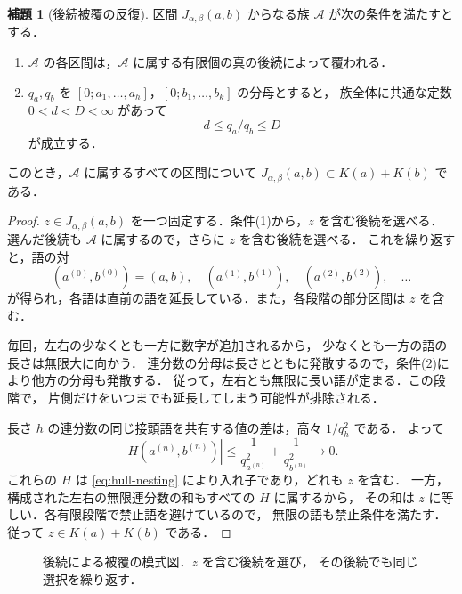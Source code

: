 \documentclass[11pt,a4paper]{article}
\theoremstyle{definition}
\newtheorem{lemma}{補題}
\newcommand{\A}{\mathcal A}
\begin{document}
\begin{lemma}[後続被覆の反復]\label{lem:filling}
区間 $J_{\alpha,\beta}(a,b)$ からなる族 $\A$ が次の条件を満たすとする．
\begin{enumerate}
\item $\A$ の各区間は，$\A$ に属する有限個の真の後続によって覆われる．
\item $q_a,q_b$ を $[0;a_1,\ldots,a_h]$，$[0;b_1,\ldots,b_k]$ の分母とすると，
族全体に共通な定数 $0<d<D<\infty$ があって
\[
 d\le q_a/q_b\le D
\]
が成立する．
\end{enumerate}
このとき，$\A$ に属するすべての区間について
$J_{\alpha,\beta}(a,b)\subset K(a)+K(b)$ である．
\end{lemma}
\begin{proof}
$z\in J_{\alpha,\beta}(a,b)$ を一つ固定する．条件(1)から，$z$ を含む後続を選べる．
選んだ後続も $\A$ に属するので，さらに $z$ を含む後続を選べる．
これを繰り返すと，語の対
\[
 (a^{(0)},b^{(0)})=(a,b),\quad
 (a^{(1)},b^{(1)}),\quad (a^{(2)},b^{(2)}),\quad\ldots
\]
が得られ，各語は直前の語を延長している．また，各段階の部分区間は $z$ を含む．

毎回，左右の少なくとも一方に数字が追加されるから，
少なくとも一方の語の長さは無限大に向かう．
連分数の分母は長さとともに発散するので，条件(2)により他方の分母も発散する．
従って，左右とも無限に長い語が定まる．この段階で，
片側だけをいつまでも延長してしまう可能性が排除される．

長さ $h$ の連分数の同じ接頭語を共有する値の差は，高々 $1/q_h^2$ である．
よって
\[
 |H(a^{(n)},b^{(n)})|
 \le \frac1{q_{a^{(n)}}^2}+\frac1{q_{b^{(n)}}^2}\longrightarrow0.
\]
これらの $H$ は \eqref{eq:hull-nesting} により入れ子であり，どれも $z$ を含む．
一方，構成された左右の無限連分数の和もすべての $H$ に属するから，
その和は $z$ に等しい．各有限段階で禁止語を避けているので，
無限の語も禁止条件を満たす．従って $z\in K(a)+K(b)$ である．
\end{proof}

\begin{figure}[htbp]
\centering
{}
\caption{後続による被覆の模式図．$z$ を含む後続を選び，
その後続でも同じ選択を繰り返す．}
\label{fig:cover}
\end{figure}
\end{document}
